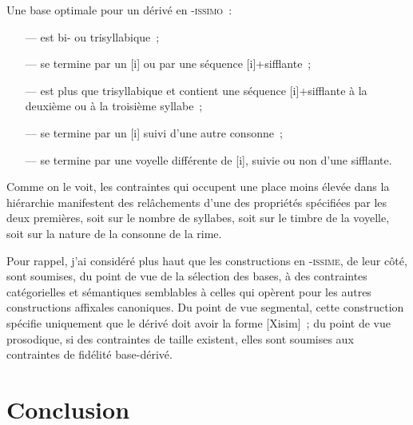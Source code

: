\documentclass[output=paper]{langsci/langscibook}
\begin{document}

\largerpage
Une base optimale pour un dérivé en -\textsc{issimo~}:

\begin{itemize}
\item[---] est bi- ou trisyllabique~;

\item[---] se termine par un {[}i{]} ou par une séquence {[}i{]}+sifflante~;

\item[---] est plus que trisyllabique et contient une séquence {[}i{]}+sifflante à
la deuxième ou à la troisième syllabe~;

\item[---] se termine par un {[}i{]} suivi d'une autre consonne~;

\item[---] se termine par une voyelle différente de {[}i{]}, suivie ou non d'une
sifflante.
\end{itemize}

Comme on le voit, les contraintes qui occupent une place moins élevée
dans la hiérarchie manifestent des relâchements d'une des propriétés
spécifiées par les deux premières, soit sur le nombre de syllabes, soit
sur le timbre de la voyelle, soit sur la nature de la consonne de la
rime.

Pour rappel, j'ai considéré plus haut que les constructions en 
\textsc{-issime}, de leur côté, sont soumises, du point de vue de la
sélection des bases, à des contraintes catégorielles et sémantiques
semblables à celles qui opèrent pour les autres constructions affixales
canoniques. Du point de vue segmental, cette construction spécifie
uniquement que le dérivé doit avoir la forme {[}Xisim{]}~; du point de
vue prosodique, si des contraintes de taille existent, elles sont
soumises aux contraintes de fidélité base-dérivé.

\section{Conclusion}\label{sec:montermini:4}
\end{document}
